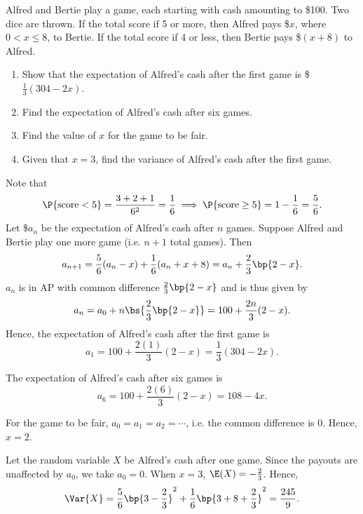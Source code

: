 \begin{problem}
    Alfred and Bertie play a game, each starting with cash amounting to \$100. Two dice are thrown. If the total score if 5 or more, then Alfred pays \$$x$, where $0 < x \leq 8$, to Bertie. If the total score if 4 or less, then Bertie pays \$$(x+8)$ to Alfred.

    \begin{enumerate}
        \item Show that the expectation of Alfred's cash after the first game is \$$\frac13 (304 - 2x)$.
        \item Find the expectation of Alfred's cash after six games.
        \item Find the value of $x$ for the game to be fair.
        \item Given that $x = 3$, find the variance of Alfred's cash after the first game.
    \end{enumerate}
\end{problem}
\begin{solution}
    \begin{ppart}
        Note that \[\P{\text{score}<5} = \frac{3 + 2 + 1}{6^2} = \frac16 \implies \P{\text{score} \geq 5} = 1 - \frac16 = \frac56.\] Let \$$a_n$ be the expectation of Alfred's cash after $n$ games. Suppose Alfred and Bertie play one more game (i.e. $n + 1$ total games). Then \[a_{n+1} = \frac56 (a_n - x) + \frac16(a_n + x + 8) = a_n + \frac23 \bp{2-x}.\] $a_n$ is in AP with common difference $\frac23 \bp{2-x}$ and is thus given by \[a_n = a_0 + n\bs{\frac23 \bp{2-x}} = 100 + \frac{2n}{3}(2-x).\] Hence, the expectation of Alfred's cash after the first game is \[a_1 = 100 + \frac{2(1)}3(2 - x) = \frac13(304 - 2x).\]
    \end{ppart}
    \begin{ppart}
        The expectation of Alfred's cash after six games is \[a_6 = 100 + \frac{2(6)}{3}(2 - x) = 108 - 4x.\]
    \end{ppart}
    \begin{ppart}
        For the game to be fair, $a_0 = a_1 = a_2 = \cdots$, i.e. the common difference is 0. Hence, $x = 2$.
    \end{ppart}
    \begin{ppart}
        Let the random variable $X$ be Alfred's cash after one game. Since the payouts are unaffected by $a_0$, we take $a_0 = 0$. When $x = 3$, $\E(X) = -\frac23$. Hence, \[\Var{X} = \frac56 \bp{3 - \frac23}^2 + \frac16 \bp{3 + 8 + \frac23}^2 = \frac{245}{9}.\]
    \end{ppart}
\end{solution}

